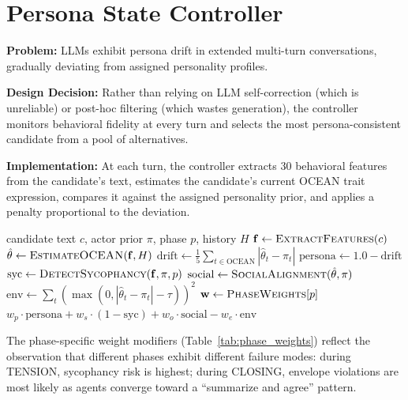 \section{Persona State Controller}

\textbf{Problem:} LLMs exhibit persona drift in extended multi-turn conversations, gradually deviating from assigned personality profiles.

\textbf{Design Decision:} Rather than relying on LLM self-correction (which is unreliable) or post-hoc filtering (which wastes generation), the controller monitors behavioral fidelity at every turn and selects the most persona-consistent candidate from a pool of alternatives.

\textbf{Implementation:} At each turn, the controller extracts 30 behavioral features from the candidate's text, estimates the candidate's current OCEAN trait expression, compares it against the assigned personality prior, and applies a penalty proportional to the deviation.

\begin{algorithm}[t]
\caption{Candidate Scoring Function}
\label{alg:scoring}
\begin{algorithmic}[1]
\Require candidate text $c$, actor prior $\pi$, phase $p$, history $H$
\State $\mathbf{f} \gets \textsc{ExtractFeatures}(c)$ 
\State $\hat{\theta} \gets \textsc{EstimateOCEAN}(\mathbf{f}, H)$
\State $\text{drift} \gets \frac{1}{5}\sum_{t \in \text{OCEAN}} |\hat{\theta}_t - \pi_t|$
\State $\text{persona} \gets 1.0 - \text{drift}$
\State $\text{syc} \gets \textsc{DetectSycophancy}(\mathbf{f}, \pi, p)$
\State $\text{social} \gets \textsc{SocialAlignment}(\hat{\theta}, \pi)$
\State $\text{env} \gets \sum_{t} (\max(0, |\hat{\theta}_t - \pi_t| - \tau))^2$
\State $\mathbf{w} \gets \textsc{PhaseWeights}[p]$
\State \Return $w_p \cdot \text{persona} + w_s \cdot (1-\text{syc}) + w_o \cdot \text{social} - w_e \cdot \text{env}$
\end{algorithmic}
\end{algorithm}

The phase-specific weight modifiers (Table~\ref{tab:phase_weights}) reflect the observation that different phases exhibit different failure modes: during TENSION, sycophancy risk is highest; during CLOSING, envelope violations are most likely as agents converge toward a ``summarize and agree'' pattern.

